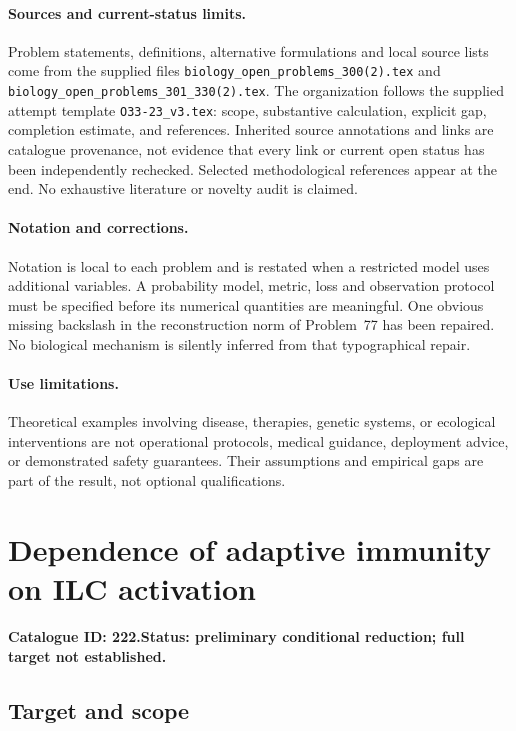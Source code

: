 \documentclass[11pt]{article}
\begin{document}
\paragraph{Sources and current-status limits.}
Problem statements, definitions, alternative formulations and local source lists
come from the supplied files
\texttt{biology\_open\_problems\_300(2).tex} and
\texttt{biology\_open\_problems\_301\_330(2).tex}.
The organization follows the supplied attempt template
\texttt{O33-23\_v3.tex}: scope, substantive calculation, explicit gap,
completion estimate, and references. Inherited source annotations and links are
catalogue provenance, not evidence that every link or current open status has
been independently rechecked. Selected methodological references appear at the
end. No exhaustive literature or novelty audit is claimed.

\paragraph{Notation and corrections.}
Notation is local to each problem and is restated when a restricted model uses
additional variables. A probability model, metric, loss and observation protocol
must be specified before its numerical quantities are meaningful. One obvious
missing backslash in the reconstruction norm of Problem~77 has been repaired.
No biological mechanism is silently inferred from that typographical repair.

\paragraph{Use limitations.}
Theoretical examples involving disease, therapies, genetic systems, or ecological
interventions are not operational protocols, medical guidance, deployment advice,
or demonstrated safety guarantees. Their assumptions and empirical gaps are part
of the result, not optional qualifications.

\setcounter{section}{221}
\section{Dependence of adaptive immunity on ILC activation}
\label{prob:222}
\noindent\textbf{Catalogue ID: 222.}\quad \textbf{Status: preliminary conditional reduction; full target not established.}
\subsection{Target and scope}
\end{document}
